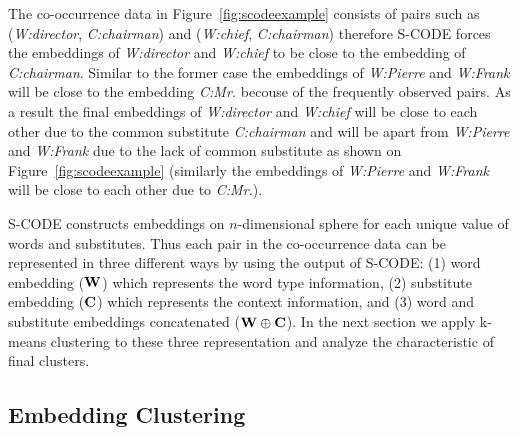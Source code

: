 
The co-occurrence data in Figure~\ref{fig:scodeexample} consists of
pairs such as (\textit{W:director}, \textit{C:chairman}) and
(\textit{W:chief}, \textit{C:chairman}) therefore S-CODE forces the
embeddings of \textit{W:director} and \textit{W:chief} to be close to
the embedding of \textit{C:chairman}.  Similar to the former case the
embeddings of \textit{W:Pierre} and \textit{W:Frank} will be close to
the embedding \textit{C:Mr.} becouse of the frequently observed pairs.
As a result the final embeddings of \textit{W:director} and
\textit{W:chief} will be close to each other due to the common
substitute \textit{C:chairman} and will be apart from
\textit{W:Pierre} and \textit{W:Frank} due to the lack of common
substitute as shown on Figure~\ref{fig:scodeexample} (similarly the
embeddings of \textit{W:Pierre} and \textit{W:Frank} will be close to
each other due to \textit{C:Mr.}).

S-CODE constructs embeddings on $n$-dimensional sphere for each unique
value of words and substitutes.  Thus each pair in the co-occurrence
data can be represented in three different ways by using the output of
S-CODE: (1) word embedding (${\bf W}$) which represents the word type
information, (2) substitute embedding (${\bf C}$) which represents the
context information, and (3) word and substitute embeddings
concatenated (${\bf W}\oplus{\bf C}$).  In the next section we apply
k-means clustering to these three representation and analyze the
characteristic of final clusters.

\subsection{Embedding Clustering}
\label{sec:clustering}

